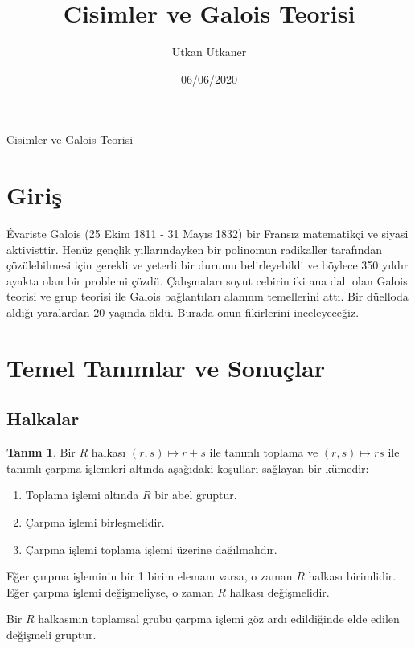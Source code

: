 \documentclass{article}
\title{Cisimler ve Galois Teorisi}
\author{Utkan Utkaner}
\date{06/06/2020}
\theoremstyle{definition}
\newtheorem{defn}{Tanım}[section]
\theoremstyle{remark}
\begin{document}
    \maketitle
	
	\newpage
	
	\renewcommand{\contentsname}{İçindekiler}
	\tableofcontents
	
	\newpage
	
	{Cisimler ve Galois Teorisi}
	\renewcommand{\sectionmark}[1]{}
	
	\section{Giriş}
	
	    Évariste Galois (25 Ekim 1811 - 31 Mayıs 1832) bir Fransız matematikçi ve siyasi aktivisttir. Henüz gençlik yıllarındayken bir polinomun radikaller tarafından çözülebilmesi için gerekli ve yeterli bir durumu belirleyebildi ve böylece 350 yıldır ayakta olan bir problemi çözdü. Çalışmaları soyut cebirin iki ana dalı olan Galois teorisi ve grup teorisi ile Galois bağlantıları alanının temellerini attı. Bir düelloda aldığı yaralardan 20 yaşında öldü. Burada onun fikirlerini inceleyeceğiz.
	    
	\section{Temel Tanımlar ve Sonuçlar}
	
	    \subsection{Halkalar}
	
    	    \begin{defn}
    	        Bir $R$ halkası $(r, s) \mapsto r + s$ ile tanımlı toplama ve $(r, s) \mapsto rs$ ile tanımlı çarpma işlemleri altında aşağıdaki koşulları sağlayan bir kümedir:
    	        \begin{enumerate}
        	    \renewcommand{\labelenumi}{(\roman{enumi})}
        			\item Toplama işlemi altında $R$ bir abel gruptur.
        			\item Çarpma işlemi birleşmelidir.
        			\item Çarpma işlemi toplama işlemi üzerine dağılmalıdır.
        		\end{enumerate}
        		Eğer çarpma işleminin bir 1 birim elemanı varsa, o zaman $R$ halkası birimlidir.
        		Eğer çarpma işlemi değişmeliyse, o zaman $R$ halkası değişmelidir.\par
        		Bir $R$ halkasının toplamsal grubu çarpma işlemi göz ardı edildiğinde elde edilen değişmeli gruptur.
        	\end{defn}
        	
\end{document}
